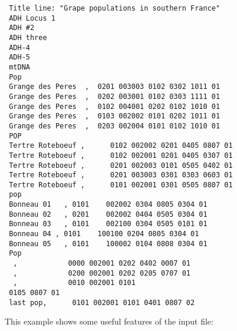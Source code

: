 \documentclass[12pt,]{book}
\theoremstyle{definition}
\theoremstyle{definition}
\theoremstyle{definition}
\theoremstyle{remark}
\begin{document}
\begin{verbatim}
 Title line: "Grape populations in southern France"
 ADH Locus 1
 ADH #2
 ADH three
 ADH-4
 ADH-5
 mtDNA
 Pop
 Grange des Peres  ,  0201 003003 0102 0302 1011 01
 Grange des Peres  ,  0202 003001 0102 0303 1111 01
 Grange des Peres  ,  0102 004001 0202 0102 1010 01
 Grange des Peres  ,  0103 002002 0101 0202 1011 01
 Grange des Peres  ,  0203 002004 0101 0102 1010 01
 POP
 Tertre Roteboeuf ,      0102 002002 0201 0405 0807 01
 Tertre Roteboeuf ,      0102 002001 0201 0405 0307 01
 Tertre Roteboeuf ,      0201 002003 0101 0505 0402 01
 Tertre Roteboeuf ,      0201 003003 0301 0303 0603 01
 Tertre Roteboeuf ,      0101 002001 0301 0505 0807 01
 pop
 Bonneau 01   , 0101    002002 0304 0805 0304 01
 Bonneau 02   , 0201    002002 0404 0505 0304 01
 Bonneau 03   , 0101    002100 0304 0505 0101 01
 Bonneau 04 , 0101    100100 0204 0805 0304 01
 Bonneau 05   , 0101    100002 0104 0808 0304 01
 Pop
  ,            0000 002001 0202 0402 0007 01
  ,            0200 002001 0202 0205 0707 01
  ,            0010 002001 0101
 0105 0807 01
 last pop,      0101 002001 0101 0401 0807 02
\end{verbatim}

This example shows some useful features of the input file:
\end{document}
